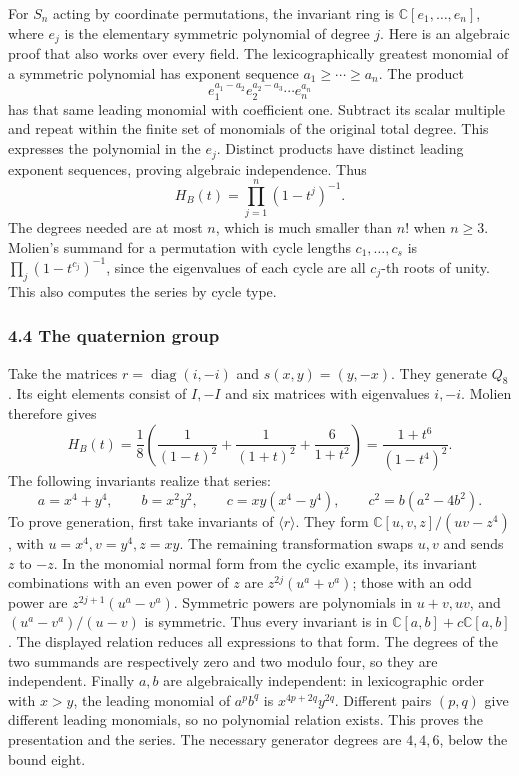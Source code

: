 \documentclass[
]{article}
\begin{document}
For \(S_n\) acting by coordinate permutations, the invariant ring is
\(\mathbb C [e_1,\ldots,e_n]\), where \(e_j\) is the elementary
symmetric polynomial of degree \(j\). Here is an algebraic proof that
also works over every field. The lexicographically greatest monomial of
a symmetric polynomial has exponent sequence \(a_1\geq\cdots\geq a_n\).
The product \[
e_1^{a_1-a_2}e_2^{a_2-a_3}\cdots e_n^{a_n}
\] has that same leading monomial with coefficient one. Subtract its
scalar multiple and repeat within the finite set of monomials of the
original total degree. This expresses the polynomial in the \(e_j\).
Distinct products have distinct leading exponent sequences, proving
algebraic independence. Thus \[
H_B(t)=\prod_{j=1}^n(1-t^j)^{-1}.
\] The degrees needed are at most \(n\), which is much smaller than
\(n!\) when \(n\geq3\). Molien's summand for a permutation with cycle
lengths \(c_1,\ldots,c_s\) is \(\prod_j(1-t^{c_j})^{-1}\), since the
eigenvalues of each cycle are all \(c_j\)-th roots of unity. This also
computes the series by cycle type.

\subsubsection{4.4 The quaternion group}\label{the-quaternion-group}

Take the matrices \(r=\operatorname{diag}(i,-i)\) and \(s(x,y)=(y,-x)\).
They generate \(Q_8\). Its eight elements consist of \(I,-I\) and six
matrices with eigenvalues \(i,-i\). Molien therefore gives \[
H_B(t)=\frac18\left(\frac1{(1-t)^2}+\frac1{(1+t)^2}
+\frac6{1+t^2}\right)
=\frac{1+t^6}{(1-t^4)^2}.
\] The following invariants realize that series: \[
a=x^4+y^4,\qquad b=x^2y^2,\qquad c=xy(x^4-y^4),\qquad
c^2=b(a^2-4b^2).
\] To prove generation, first take invariants of \(\langle r\rangle\).
They form \(\mathbb C [u,v,z]/(uv-z^4)\), with \(u=x^4,v=y^4,z=xy\). The
remaining transformation swaps \(u,v\) and sends \(z\) to \(-z\). In the
monomial normal form from the cyclic example, its invariant combinations
with an even power of \(z\) are \(z^{2j}(u^a+v^a)\); those with an odd
power are \(z^{2j+1}(u^a-v^a)\). Symmetric powers are polynomials in
\(u+v,uv\), and \((u^a-v^a)/(u-v)\) is symmetric. Thus every invariant
is in \(\mathbb C [a,b]+c\mathbb C [a,b]\). The displayed relation
reduces all expressions to that form. The degrees of the two summands
are respectively zero and two modulo four, so they are independent.
Finally \(a,b\) are algebraically independent: in lexicographic order
with \(x>y\), the leading monomial of \(a^pb^q\) is \(x^{4p+2q}y^{2q}\).
Different pairs \((p,q)\) give different leading monomials, so no
polynomial relation exists. This proves the presentation and the series.
The necessary generator degrees are \(4,4,6\), below the bound eight.
\end{document}
